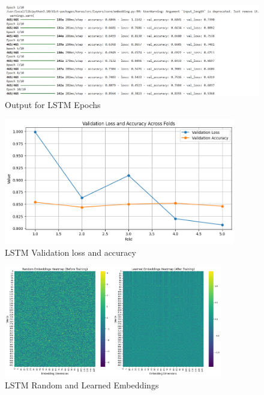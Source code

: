 \begin{figure}[h!]  
    \centering
    \includegraphics[width=1.0\textwidth]{Images/LSTM Epoch.png}  
    \caption{Output for LSTM Epochs}
    \label{LSTm Epochs}  %
\end{figure}

\begin{figure}[h!]  
    \centering
    \includegraphics[width=0.9\textwidth]{Images/LSTM LA.png}  
    \caption{LSTM Validation loss and accuracy}
    \label{Accuracy Loss}  %
\end{figure}

\begin{figure}[h!]  
    \centering
    \includegraphics[width=0.85\textwidth]{Images/LSTM EMBED.png}  
    \caption{LSTM Random and Learned Embeddings}
    \label{lstm embed}  %
\end{figure}

